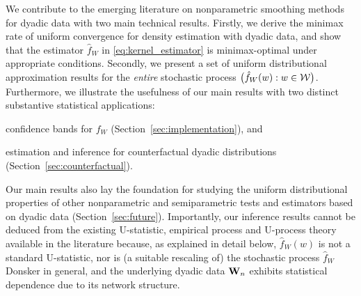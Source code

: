We contribute to the emerging literature on nonparametric smoothing methods for
dyadic data with two main technical results. Firstly, we derive the minimax
rate of uniform convergence for density estimation with dyadic data, and show
that the estimator $\hat{f}_W$ in \eqref{eq:kernel_estimator} is
minimax-optimal under appropriate conditions. Secondly, we present a set of
uniform distributional approximation results for the \emph{entire} stochastic
process $\big(\hat{f}_W(w):w\in\mathcal{W}\big)$. Furthermore, we illustrate the
usefulness of our main results with two distinct substantive statistical
applications:
%
\begin{inlineroman}
  \item
    confidence bands for $f_W$ (Section~\ref{sec:implementation}), and
  \item
    estimation and inference for counterfactual
    dyadic distributions (Section~\ref{sec:counterfactual}).
\end{inlineroman}
%
Our main results also lay the foundation for studying the uniform
distributional properties of other nonparametric and semiparametric tests and
estimators based on dyadic data (Section~\ref{sec:future}). Importantly, our
inference results cannot be deduced from the existing U-statistic, empirical
process and U-process theory available in the literature
\citep{van1996weak,gine2021mathematical} because, as explained in detail below,
$\hat{f}_W(w)$ is not a standard U-statistic, nor is
(a suitable rescaling of) the stochastic process
$\hat{f}_W$ Donsker in general, and the underlying dyadic data $\mathbf{W}_n$ exhibits
statistical dependence due to its network structure.

